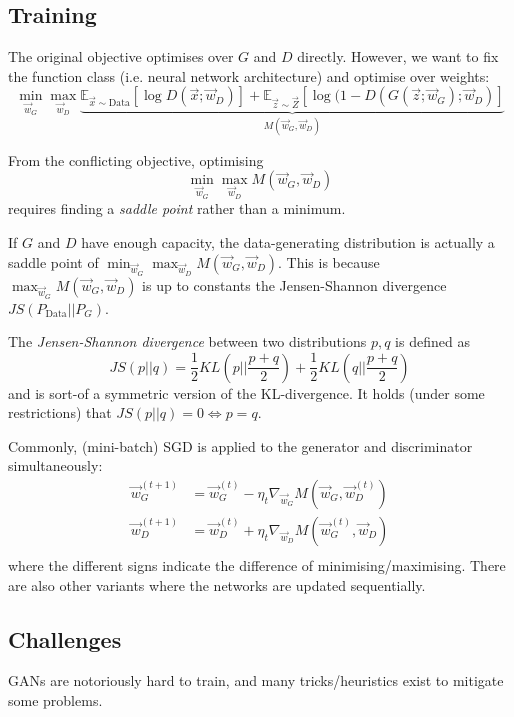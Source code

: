 \subsection{Training}
The original objective optimises over
$G$ and $D$ directly.
However, we want to fix the function class
(i.e. neural network architecture)
and optimise over weights:
\begin{equation*}
    \min_{\vec{w}_G}{\max_{\vec{w}_D}{
    \underbrace{
        \mathbb{E}_{\vec{x} \sim \text{Data}}[\log{D(\vec{x}; \vec{w}_D)}]
        +
        \mathbb{E}_{\vec{z} \sim \vec{Z}}[\log{(1 - D(G(\vec{z}; \vec{w}_G); \vec{w}_D)}]
    }_{M(\vec{w}_G, \vec{w}_D)}
    }}
\end{equation*}

From the conflicting objective,
optimising
\begin{equation*}
    \min_{\vec{w}_G}{\max_{\vec{w}_D}{
    M(\vec{w}_G, \vec{w}_D)
    }}
\end{equation*}
requires finding a \emph{saddle point}
rather than a minimum.

If $G$ and $D$ have enough capacity,
the data-generating distribution is
actually a saddle point of
$\min_{\vec{w}_G}{\max_{\vec{w}_D}{M(\vec{w}_G, \vec{w}_D)}}$.
This is because
$\max_{\vec{w}_G}{M(\vec{w}_G, \vec{w}_D)}$ is
up to constants the Jensen-Shannon divergence
$JS(P_\text{Data} || P_G)$.

The \emph{Jensen-Shannon divergence} between
two distributions $p, q$ is defined as
\begin{equation*}
    JS(p || q) =
    \frac{1}{2} KL(p || \frac{p+q}{2})
    +
    \frac{1}{2} KL(q || \frac{p+q}{2})
\end{equation*}
and is sort-of a symmetric version
of the KL-divergence.
It holds (under some restrictions) that
$JS(p || q) = 0 \Leftrightarrow p = q$.

Commonly, (mini-batch) SGD is applied to
the generator and discriminator simultaneously:
\begin{align*}
    \vec{w}_G^{(t+1)} &= \vec{w}_G^{(t)} - \eta_t \nabla_{\vec{w}_G} M(\vec{w}_G, \vec{w}_D^{(t)}) \\
    \vec{w}_D^{(t+1)} &= \vec{w}_D^{(t)} + \eta_t \nabla_{\vec{w}_D} M(\vec{w}_G^{(t)}, \vec{w}_D) \\
\end{align*}
where the different signs indicate the difference
of minimising/maximising.
There are also other variants where the
networks are updated sequentially.


\subsection{Challenges}
GANs are notoriously hard to train,
and many tricks/heuristics exist to
mitigate some problems.

